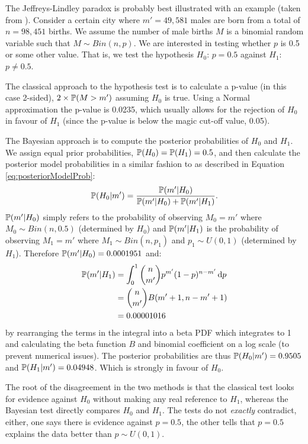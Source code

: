 The Jeffreys-Lindley paradox is probably best illustrated with an example (taken from \cite{wikiExample}).
Consider a certain city where \(m' = 49,581\) males are born from a total of \(n = 98,451\) births. We assume the number
of male births \(M\) is a binomial random variable such that \(M \sim Bin(n, p)\). We are interested in testing whether
\(p\) is 0.5 or some other value. That is, we test the hypothesis \(H_0\): \(p = 0.5\) against \(H_1\): \(p \neq 0.5\).

The classical approach to the hypothesis test is to calculate a p-value (in this case 2-sided), \(2 \times \mathbb{P}(M >
m')\) assuming \(H_0\) is true. Using a Normal approximation the p-value is 0.0235, which usually allows for the
rejection of \(H_0\) in favour of \(H_1\) (since the p-value is below the magic cut-off value, 0.05).

The Bayesian approach is to compute the posterior probabilities of \(H_0\) and \(H_1\). We assign equal prior
probabilities, \(\mathbb{P}(H_0) = \mathbb{P}(H_1) = 0.5\), and then calculate the posterior model probabilities in a similar fashion
to as described in Equation \eqref{eq:posteriorModelProb}:
\begin{align} 
\mathbb{P}(H_0 | m') = \frac{\mathbb{P}(m' | H_0)}{\mathbb{P}(m' | H_0) + \mathbb{P}(m' | H_1)}.
\end{align}
\(\mathbb{P}(m' | H_0)\) simply refers to the probability of observing \(M_0 = m'\) where \(M_0 \sim Bin(n, 0.5)\) (determined
by \(H_0\)) and \(\mathbb{P}(m' | H_1)\) is the probability of observing \(M_1 = m'\) where \(M_1 \sim Bin(n, p_1)\) and
\(p_1 \sim U(0, 1)\) (determined by \(H_1\)). Therefore \(\mathbb{P}(m' | H_0) = 0.0001951\) and:
\begin{align} 
\mathbb{P}(m' | H_1) &= \int_0^1 \binom{n}{m'} p^{m'} (1 - p)^{n - m'} \, \mathrm{d}p \notag \\
			&= \binom{n}{m'} B(m' + 1, n - m' + 1) \notag \\
			&= 0.00001016
\end{align}
by rearranging the terms in the integral into a beta \gls{PDF} which integrates to 1 and calculating the beta function
\(B\) and binomial coefficient on a log scale (to prevent numerical issues). The posterior probabilities are thus
\(\mathbb{P}(H_0 | m') = 0.9505\) and \(\mathbb{P}(H_1 | m') = 0.04948\). Which is strongly in favour of \(H_0\).

The root of the disagreement in the two methods is that the classical test looks for evidence against \(H_0\) without
making any real reference to \(H_1\), whereas the Bayesian test directly compares \(H_0\) and \(H_1\).
The tests do not \textit{exactly} contradict, either, one says there is evidence against \(p = 0.5\), the other tells
that \(p = 0.5\) explains the data better than \(p \sim U(0, 1)\).

